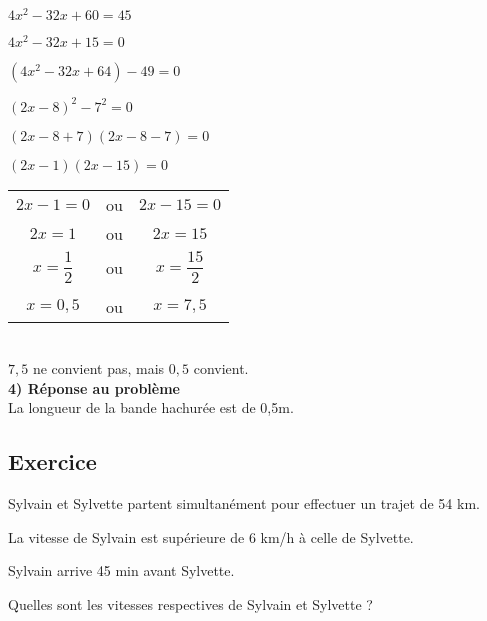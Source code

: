 $ 4x^2 - 32x + 60 = 45 $

$ 4x^2 - 32x + 15 = 0 $

$ \left(4x^2 - 32x  + 64\right)-49=0 $

$ \left(2x - 8\right)^2 - 7^2 = 0 $

$ \left(2x-8+7\right)\left(2x-8-7\right) = 0 $

$ \left(2x-1\right)\left(2x-15\right) = 0 $ \\

\begin{tabular}{ccc}
$2x-1=0$ & ou &$2x-15=0$ \\
$2x=1$ & ou & $2x = 15$ \\
$x=\dfrac{1}{2}$& ou &$ x = \dfrac{15}{2} $ \\
\\
$x=0,5$& ou &$x= 7,5$ \\
\end{tabular} \\

$7,5$ ne convient pas, mais $0,5$ convient. \\

\textbf{4) Réponse au problème} \\

La longueur de la bande hachurée est de 0,5m.

\newpage

\subsection{Exercice }


Sylvain et Sylvette partent simultanément pour effectuer un trajet de 54 km.


La vitesse de Sylvain est supérieure de 6 km/h à celle de Sylvette.

Sylvain arrive 45 min avant Sylvette.

Quelles sont les vitesses respectives de Sylvain et Sylvette ? \\

